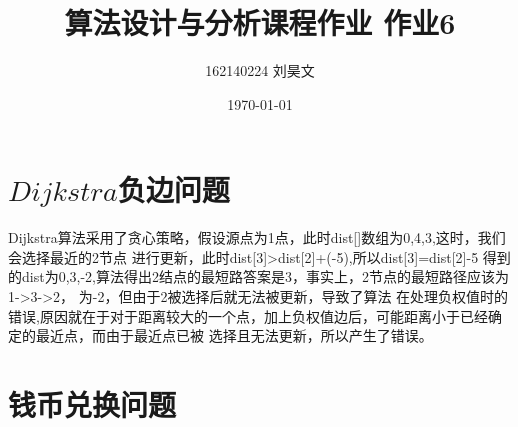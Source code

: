\documentclass{article}
\title{\textbf{算法设计与分析课程作业 作业6}}
\author{162140224 刘昊文}
\date{\today}
\begin{document}
\maketitle
\section{$Dijkstra$负边问题}
    

    Dijkstra算法采用了贪心策略，假设源点为1点，此时dist[]数组为{0,4,3},这时，我们会选择最近的2节点
    进行更新，此时dist[3]>dist[2]+(-5),所以dist[3]=dist[2]-5
    得到的dist为{0,3,-2},算法得出2结点的最短路答案是3，事实上，2节点的最短路径应该为1->3->2，
    为-2，但由于2被选择后就无法被更新，导致了算法
    在处理负权值时的错误,原因就在于对于距离较大的一个点，加上负权值边后，可能距离小于已经确定的最近点，而由于最近点已被
    选择且无法更新，所以产生了错误。

\newpage
    \section{钱币兑换问题}
\end{document}
